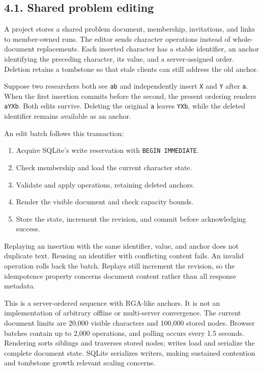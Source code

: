 \documentclass[11pt,a4paper]{article}
\begin{document}
\subsection*{4.1. Shared problem editing}

A project stores a shared problem document, membership, invitations, and links to member-owned runs. The editor sends character operations instead of whole-document replacements. Each inserted character has a stable identifier, an anchor identifying the preceding character, its value, and a server-assigned order. Deletion retains a tombstone so that stale clients can still address the old anchor.

Suppose two researchers both see \nolinkurl{ab} and independently insert \nolinkurl{X} and \nolinkurl{Y} after \nolinkurl{a}. When the first insertion commits before the second, the present ordering renders \nolinkurl{aYXb}. Both edits survive. Deleting the original \nolinkurl{a} leaves \nolinkurl{YXb}, while the deleted identifier remains available as an anchor.

An edit batch follows this transaction:

\begin{enumerate}

\item Acquire SQLite's write reservation with \texttt{BEGIN IMMEDIATE}.

\item Check membership and load the current character state.

\item Validate and apply operations, retaining deleted anchors.

\item Render the visible document and check capacity bounds.

\item Store the state, increment the revision, and commit before acknowledging success.

\end{enumerate}

Replaying an insertion with the same identifier, value, and anchor does not duplicate text. Reusing an identifier with conflicting content fails. An invalid operation rolls back the batch. Replays still increment the revision, so the idempotence property concerns document content rather than all response metadata.

This is a server-ordered sequence with RGA-like anchors. It is not an implementation of arbitrary offline or multi-server convergence. The current document limits are 20,000 visible characters and 100,000 stored nodes. Browser batches contain up to 2,000 operations, and polling occurs every 1.5 seconds. Rendering sorts siblings and traverses stored nodes; writes load and serialize the complete document state. SQLite serializes writers, making sustained contention and tombstone growth relevant scaling concerns.
\end{document}
